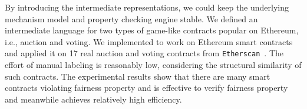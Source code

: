 By introducing the intermediate representations, we could keep the underlying mechanism model and
property checking engine stable.
We defined an intermediate language for two types of game-like contracts popular on Ethereum, i.e.,
auction and voting.
We implemented \faircon to work on Ethereum smart contracts and applied it on 17 real auction and
voting contracts from \texttt{Etherscan}~\cite{Etherscan}.
The effort of manual labeling is reasonably low, considering the structural similarity of such
contracts.
The experimental results show that there are many smart contracts violating fairness property and \faircon is effective to verify fairness property and meanwhile achieves relatively high efficiency.


